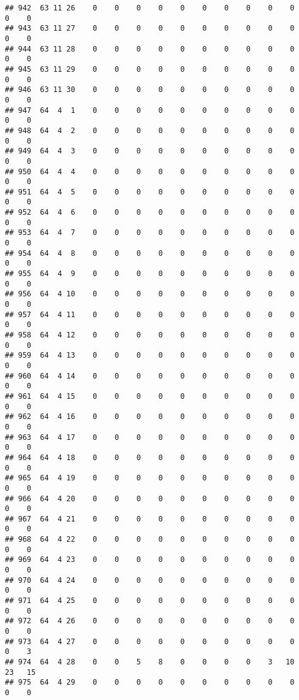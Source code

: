 \documentclass[]{article}
\begin{document}
\begin{verbatim}
## 942  63 11 26    0    0    0    0    0    0    0    0    0    0    0    0
## 943  63 11 27    0    0    0    0    0    0    0    0    0    0    0    0
## 944  63 11 28    0    0    0    0    0    0    0    0    0    0    0    0
## 945  63 11 29    0    0    0    0    0    0    0    0    0    0    0    0
## 946  63 11 30    0    0    0    0    0    0    0    0    0    0    0    0
## 947  64  4  1    0    0    0    0    0    0    0    0    0    0    0    0
## 948  64  4  2    0    0    0    0    0    0    0    0    0    0    0    0
## 949  64  4  3    0    0    0    0    0    0    0    0    0    0    0    0
## 950  64  4  4    0    0    0    0    0    0    0    0    0    0    0    0
## 951  64  4  5    0    0    0    0    0    0    0    0    0    0    0    0
## 952  64  4  6    0    0    0    0    0    0    0    0    0    0    0    0
## 953  64  4  7    0    0    0    0    0    0    0    0    0    0    0    0
## 954  64  4  8    0    0    0    0    0    0    0    0    0    0    0    0
## 955  64  4  9    0    0    0    0    0    0    0    0    0    0    0    0
## 956  64  4 10    0    0    0    0    0    0    0    0    0    0    0    0
## 957  64  4 11    0    0    0    0    0    0    0    0    0    0    0    0
## 958  64  4 12    0    0    0    0    0    0    0    0    0    0    0    0
## 959  64  4 13    0    0    0    0    0    0    0    0    0    0    0    0
## 960  64  4 14    0    0    0    0    0    0    0    0    0    0    0    0
## 961  64  4 15    0    0    0    0    0    0    0    0    0    0    0    0
## 962  64  4 16    0    0    0    0    0    0    0    0    0    0    0    0
## 963  64  4 17    0    0    0    0    0    0    0    0    0    0    0    0
## 964  64  4 18    0    0    0    0    0    0    0    0    0    0    0    0
## 965  64  4 19    0    0    0    0    0    0    0    0    0    0    0    0
## 966  64  4 20    0    0    0    0    0    0    0    0    0    0    0    0
## 967  64  4 21    0    0    0    0    0    0    0    0    0    0    0    0
## 968  64  4 22    0    0    0    0    0    0    0    0    0    0    0    0
## 969  64  4 23    0    0    0    0    0    0    0    0    0    0    0    0
## 970  64  4 24    0    0    0    0    0    0    0    0    0    0    0    0
## 971  64  4 25    0    0    0    0    0    0    0    0    0    0    0    0
## 972  64  4 26    0    0    0    0    0    0    0    0    0    0    0    0
## 973  64  4 27    0    0    0    0    0    0    0    0    0    0    0    3
## 974  64  4 28    0    0    5    8    0    0    0    0    3   10   23   15
## 975  64  4 29    0    0    0    0    0    0    0    0    0    0    0    0

\end{verbatim}
\end{document}
